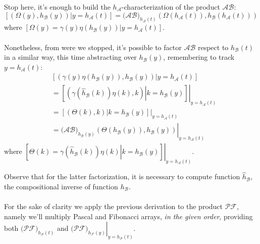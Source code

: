 Stop here, it's enough to build the $h_{\mathcal{A}}$-characterization 
of the product $\mathcal{A}\mathcal{B}$:
\begin{displaymath}
        \left[\left.\left(\Omega(y), h_{\mathcal{B}}(y)  \right) \right| y=h_{\mathcal{A}}(t) \right] 
        =\big(\mathcal{A}\mathcal{B}\big)_{h_{\mathcal{A}}(t)}\left(
            \Omega(h_{\mathcal{A}}(t)), h_{\mathcal{B}}(h_{\mathcal{A}}(t))  \right)
\end{displaymath}
where $\left[\left.\Omega(y)= \gamma(y)\eta(h_{\mathcal{B}}(y))\right| y=h_{\mathcal{A}}(t) \right]$. 
\\\\
Nonetheless, 
from were we stopped, it's possible to factor $\mathcal{A}\mathcal{B}$ respect to $h_{\mathcal{B}}(t)$ in
a similar way, this time abstracting over $h_{\mathcal{B}}(y)$, remembering to track $y=h_{\mathcal{A}}(t)$:
\begin{displaymath}
    \begin{split}
        &\left[\left.\left(\gamma(y)\eta(h_{\mathcal{B}}(y)), h_{\mathcal{B}}(y)  \right) \right|
             y=h_{\mathcal{A}}(t) \right]\\
        &=\left.\left[\left.\left(\gamma(\hat{h}_{\mathcal{B}}(k))\eta(k), k  \right) \right|
             k=h_{\mathcal{B}}(y) \right]\right|_{y=h_{\mathcal{A}}(t)}\\
        &=\left.\left[\left.\left(\Theta(k), k  \right) \right| k=h_{\mathcal{B}}(y) \right]\right|_{y=h_{\mathcal{A}}(t)}\\
        &=\left.\big(\mathcal{A}\mathcal{B}\big)_{h_{\mathcal{B}}(y)}\left(
            \Theta(h_{\mathcal{B}}(y)), h_{\mathcal{B}}(y)  \right)\right|_{y=h_{\mathcal{A}}(t)}
    \end{split}
\end{displaymath}
where $\left.\left[\left.\Theta(k)=\gamma(\hat{h}_{\mathcal{B}}(k))\eta(k) \right| 
    k=h_{\mathcal{B}}(y) \right]\right|_{y=h_{\mathcal{A}}(t)}$.

Observe that for the latter factorization, it is necessary to compute function $\hat{h}_{\mathcal{B}}$, 
the compositional inverse of function $h_{\mathcal{B}}$.
\\\\
For the sake of clarity we apply the previous derivation to the product $\mathcal{P}\mathcal{F}$, namely
we'll multiply Pascal and Fibonacci arrays, \emph{in the given order}, providing 
both $\big(\mathcal{P}\mathcal{F}\big)_{h_{\mathcal{P}}(t)}$ 
and $\left.\big(\mathcal{P}\mathcal{F}\big)_{h_{\mathcal{F}}(y)}\right|_{y=h_{\mathcal{P}}(t)}$.

